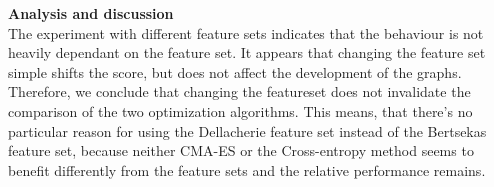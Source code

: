\textbf{Analysis and discussion}\\
The experiment with different feature sets indicates that the behaviour 
is not heavily dependant on the feature set.
It appears that changing the feature set simple shifts the score,
but does not affect the development of the graphs.\\
Therefore, we conclude that changing the featureset does not invalidate
the comparison of the two optimization algorithms. This means, that there's
no particular reason for using the Dellacherie feature set instead of the 
Bertsekas feature set, because neither CMA-ES or the Cross-entropy method seems
to benefit differently from the feature sets and the relative performance remains.
